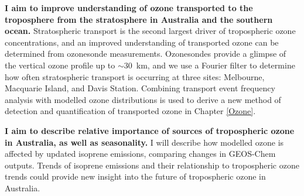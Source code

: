   \textbf{I aim to improve understanding of ozone transported to the troposphere from the stratosphere in Australia and the southern ocean.}
  Stratospheric transport is the second largest driver of tropospheric ozone concentrations, and an improved understanding of transported ozone can be determined from ozonesonde measurements.
  Ozonesondes provide a glimpse of the vertical ozone profile up to $\sim 30$~km, and we use a Fourier filter to determine how often stratospheric transport is occurring at three sites: Melbourne, Macquarie Island, and Davis Station. 
  Combining transport event frequency analysis with modelled ozone distributions is used to derive a new method of detection and quantification of transported ozone in Chapter \ref{Ozone}.
  
  
  \textbf{I aim to describe relative importance of sources of tropospheric ozone in Australia, as well as seasonality.}
  I will describe how modelled ozone is affected by updated isoprene emissions, comparing changes in GEOS-Chem outputs.
  Trends of isoprene emissions and their relationship to tropospheric ozone trends could provide new insight into the future of tropospheric ozone in Australia.
  

